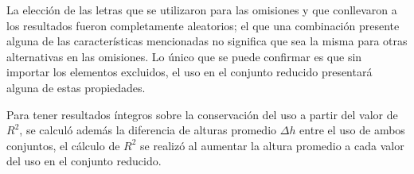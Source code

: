 La elección de las letras que se utilizaron para las omisiones y que conllevaron a los resultados fueron completamente aleatorios;  el que una combinación presente alguna de las características mencionadas no significa que sea la misma para otras alternativas en las omisiones. Lo único que se puede confirmar es que sin importar los elementos excluidos, el uso en el conjunto reducido presentará alguna de estas propiedades. 


Para tener resultados íntegros sobre la conservación del uso a partir del valor de $R^{2}$,  se calculó además la diferencia de alturas  promedio $\Delta h$ entre el uso de ambos conjuntos, el cálculo  de $R^{2}$ se realizó al aumentar la altura promedio a cada valor del uso en el conjunto reducido.



